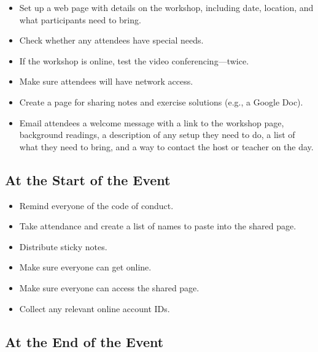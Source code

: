 \begin{itemize}

\item
  Set up a web page with details on the workshop,
  including date,
  location,
  and what participants need to bring.

\item
  Check whether any attendees have special needs.

\item
  If the workshop is online, test the video conferencing---twice.

\item
  Make sure attendees will have network access.

\item
  Create a page for sharing notes and exercise solutions (e.g., a Google Doc).

\item
  Email attendees a welcome message with
  a link to the workshop page,
  background readings,
  a description of any setup they need to do,
  a list of what they need to bring,
  and a way to contact the host or teacher on the day.

\end{itemize}

\subsection*{At the Start of the Event}

\begin{itemize}

\item
  Remind everyone of the code of conduct.

\item
  Take attendance
  and create a list of names to paste into the shared page.

\item
  Distribute sticky notes.

\item
  Make sure everyone can get online.
  
\item
  Make sure everyone can access the shared page.

\item
  Collect any relevant online account IDs.

\end{itemize}

\subsection*{At the End of the Event}

